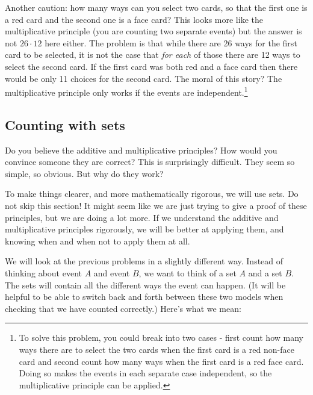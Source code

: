 \documentclass[12pt]{article}
\begin{document}
 Another caution: how many ways can you select two cards, so that the first one is a red card and the second one is a face card?  This looks more like the multiplicative principle (you are counting two separate events) but the answer is not $26 \cdot 12$ here either.  The problem is that while there are 26 ways for the first card to be selected, it is not the case that {\em for each} of those there are 12 ways to select the second card.  If the first card was both red and a face card then there would be only 11 choices for the second card.  The moral of this story?  The multiplicative principle only works if the events are independent.\footnote{To solve this problem, you could break into two cases - first count how many ways there are to select the two cards when the first card is a red non-face card and second count how many ways when the first card is a red face card.  Doing so makes the events in each separate case independent, so the multiplicative principle can be applied.}

\subsection{Counting with sets}

Do you believe the additive and multiplicative principles?  How would you convince someone they are correct?  This is surprisingly difficult.  They seem so simple, so obvious.  But why do they work?  

To make things clearer, and more mathematically rigorous, we will use sets.  Do not skip this section!  It might seem like we are just trying to give a proof of these principles, but we are doing a lot more.  If we understand the additive and multiplicative principles rigorously, we will be better at applying them, and knowing when and when not to apply them at all.

We will look at the previous problems in a slightly different way.  Instead of thinking about event $A$ and event $B$, we want to think of a set $A$ and a set $B$.  The sets will contain all the different ways the event can happen.  (It will be helpful to be able to switch back and forth between these two models when checking that we have counted correctly.)  Here's what we mean:
\end{document}
